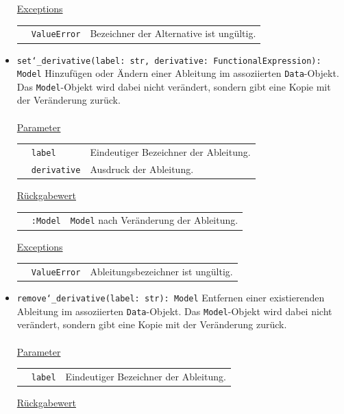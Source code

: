 \documentclass{article}
\begin{document}
\begin{itemize}
\underline{Exceptions}\\
\begin{tabular}{lll}
 & \texttt{ValueError} & Bezeichner der Alternative ist ungültig.\\
\end{tabular}


\item \texttt{set\char`_derivative(label: str, derivative: FunctionalExpression): Model} \newline Hinzufügen oder Ändern einer Ableitung im assoziierten \texttt{Data}-Objekt. Das \texttt{Model}-Objekt wird dabei nicht verändert, sondern gibt eine Kopie mit der Veränderung zurück.
\\\\
\underline{{Parameter}}

\begin{tabular}{lll}
 & \texttt{label} & Eindeutiger Bezeichner der Ableitung. \\
 & \texttt{derivative} & Ausdruck der Ableitung. \\
\end{tabular}

\underline{{Rückgabewert}}

\begin{tabular}{lll}
 & \texttt{:Model} & \texttt{Model} nach Veränderung der Ableitung. \\
\end{tabular}

\underline{Exceptions}\\
\begin{tabular}{lll}
 & \texttt{ValueError} & Ableitungsbezeichner ist ungültig.\\
\end{tabular}


\item \texttt{remove\char`_derivative(label: str): Model} \newline Entfernen einer existierenden Ableitung im assoziierten \texttt{Data}-Objekt. Das \texttt{Model}-Objekt wird dabei nicht verändert, sondern gibt eine Kopie mit der Veränderung zurück.
\\\\
\underline{{Parameter}}

\begin{tabular}{lll}
 & \texttt{label} & Eindeutiger Bezeichner der Ableitung. \\
\end{tabular}

\underline{{Rückgabewert}}


\end{itemize}
\end{document}
